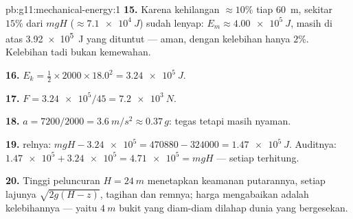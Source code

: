 \begin{solution}{pb:g11:mechanical-energy:1}
\textbf{15.} Karena kehilangan $\approx 10\%$ tiap \qty{60}{m}, sekitar
$15\%$ dari $mgH$ ($\approx \qty{7.1e4}{J}$) sudah lenyap:
$E_m \approx \qty{4.00e5}{J}$, masih di atas \qty{3.92e5}{J} yang
dituntut --- aman, dengan kelebihan hanya $2\%$. Kelebihan tadi bukan
kemewahan.

\textbf{16.} $E_k = \tfrac12 \times 2000 \times 18.0^2 =
\qty{3.24e5}{J}$.

\textbf{17.} $F = \num{3.24e5}/45 = \qty{7.2e3}{N}$.

\textbf{18.} $a = 7200/2000 = \qty{3.6}{m/s^2} \approx 0.37\,g$: tegas
tetapi masih nyaman.

\textbf{19.}  relnya: $mgH - \num{3.24e5} = \num{470880} -
\num{324000} = \qty{1.47e5}{J}$. Auditnya:
$\num{1.47e5} + \num{3.24e5} =
\num{4.71e5} = mgH$ --- setiap 
terhitung.

\textbf{20.} Tinggi peluncuran $H = \qty{24}{m}$ menetapkan keamanan
putarannya, setiap lajunya $\sqrt{2g(H - z)}$, tagihan  dan
 remnya; harga mengabaikan  adalah kelebihannya --- yaitu
$\qty{4}{m}$ bukit yang diam-diam dilahap dunia yang bergesekan.
\end{solution}
